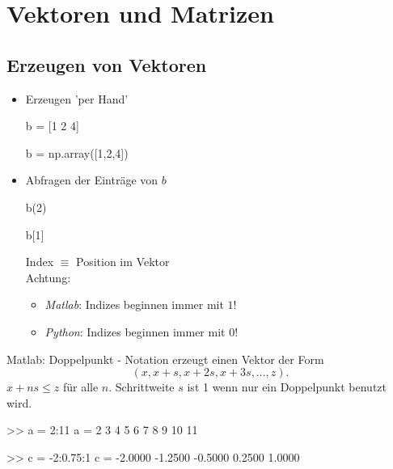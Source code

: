 \documentclass[hyperref={xetex}]{beamer}
\begin{document}
\section{Vektoren und Matrizen}



\subsection{Erzeugen von Vektoren}
%
%
\begin{frame}[fragile]{}
\begin{itemize}
\item Erzeugen 'per Hand'
\begin{matlabin}
b = [1 2 4]
\end{matlabin}
\begin{pyin}
b = np.array([1,2,4])
\end{pyin}

\item Abfragen der Einträge von $b$
\begin{matlabin}
b(2)
\end{matlabin}
\begin{pyin}
b[1]
\end{pyin}

Index $\equiv$ Position im Vektor\\

\alert{Achtung}: 

\begin{itemize}
  \item \emph{Matlab}: Indizes beginnen immer mit $1$!
\item \emph{Python}: Indizes beginnen immer mit $0$!
\end{itemize}

\end{itemize}
\end{frame}

%
\begin{frame}[fragile]{Matlab: Doppelpunkt - Notation}
 erzeugt einen Vektor der Form 
\[ (x,x+s,x+2s,x+3s, \ldots ,z). \]
$x + ns \leq z$ für alle $n$. 
Schrittweite $s$ ist 1 wenn nur ein Doppelpunkt benutzt wird.
\begin{matlabin}
>> a = 2:11
a =
 2  3  4  5  6  7  8  9  10  11

>> c = -2:0.75:1
c =
 -2.0000 -1.2500 -0.5000 0.2500 1.0000
\end{matlabin}
\end{frame} 
\end{document}
